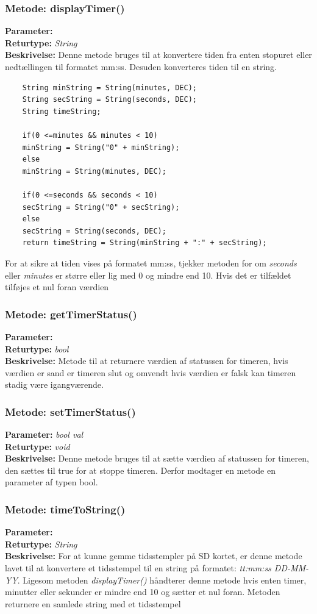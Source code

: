 \subsubsection{Metode: displayTimer()}
\textbf{Parameter: }
\\ \textbf{Returtype: } \textit{ String}
\\ \textbf{Beskrivelse: } Denne metode bruges til at konvertere tiden fra enten stopuret eller nedtællingen til formatet mm:ss. Desuden konverteres tiden til en string. 
\begin{lstlisting}
	String minString = String(minutes, DEC);
	String secString = String(seconds, DEC);
	String timeString;
	
	if(0 <=minutes && minutes < 10)
	minString = String("0" + minString);
	else
	minString = String(minutes, DEC);
	
	if(0 <=seconds && seconds < 10)
	secString = String("0" + secString);
	else
	secString = String(seconds, DEC);
	return timeString = String(minString + ":" + secString);
\end{lstlisting}
For at sikre at tiden vises på formatet mm:ss, tjekker metoden for om \textit{seconds} eller \textit{minutes} er større eller lig med 0 og mindre end 10. Hvis det er tilfældet tilføjes et nul foran værdien 

\subsubsection{Metode: getTimerStatus()}
\textbf{Parameter: } 
\\ \textbf{Returtype: } \textit{bool}
\\ \textbf{Beskrivelse: } Metode til at returnere værdien af statussen for timeren, hvis værdien er sand er timeren slut og omvendt hvis værdien er falsk kan timeren stadig være igangværende. 

\subsubsection{Metode: setTimerStatus()}
\textbf{Parameter: } \textit{bool val}
\\ \textbf{Returtype: } \textit{void}
\\ \textbf{Beskrivelse: } Denne metode bruges til at sætte værdien af statussen for timeren, den sættes til true for at stoppe timeren. Derfor modtager en metode en parameter af typen bool. 

\subsubsection{Metode: timeToString()}
\textbf{Parameter: } 
\\ \textbf{Returtype: } \textit{String}
\\ \textbf{Beskrivelse: } For at kunne gemme tidsstempler på SD kortet, er denne metode lavet til at konvertere et tidsstempel til en string på formatet: \textit{tt:mm:ss DD-MM-YY}. Ligesom metoden \textit{displayTimer()} håndterer denne metode hvis enten timer, minutter eller sekunder er mindre end 10 og sætter et nul foran. Metoden returnere en samlede string med et tidsstempel 

